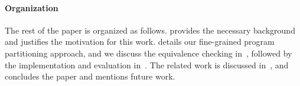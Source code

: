 \paragraph*{Organization}
The rest of the paper is organized as follows.
 provides the necessary background and justifies the motivation for this work.
 details our fine-grained program partitioning approach, and we discuss the equivalence checking in~, followed by the implementation and evaluation in~.
The related work is discussed in~, and  concludes the paper and mentions future work. 

